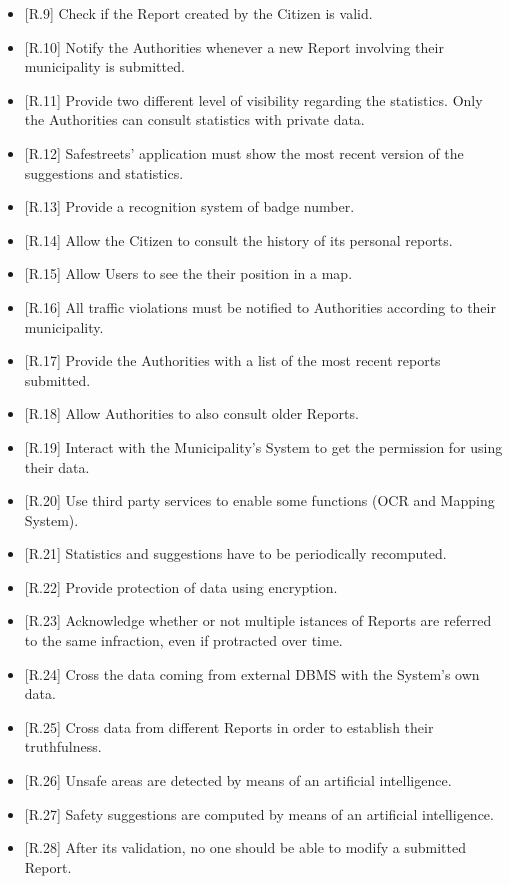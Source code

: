 \documentclass{report}
\begin{document}
\begin{itemize}
	\item {[R.9]} Check if the Report created by the Citizen is valid.
	\item {[R.10]} Notify the Authorities whenever a new Report involving their municipality is submitted. 
	\item {[R.11]} Provide two different level of visibility regarding the statistics. Only the Authorities can consult statistics with private data.
	\item {[R.12]} Safestreets' application must show the most recent version of the suggestions and statistics.
	\item {[R.13]} Provide a recognition system of badge number.
	\item {[R.14]} Allow the Citizen to consult the history of its personal reports.
	\item {[R.15]} Allow Users to see the their position in a map.
	\item {[R.16]} All traffic violations must be notified to Authorities according to their municipality.
	\item {[R.17]} Provide the Authorities with a list of the most recent reports submitted.
	\item {[R.18]} Allow Authorities to also consult older Reports.
	\item {[R.19]} Interact with the Municipality's System to get the permission for using their data.
	\item {[R.20]} Use third party services to enable some functions (OCR and Mapping System).
	\item {[R.21]} Statistics and suggestions have to be periodically recomputed.
	\item {[R.22]} Provide protection of data using encryption.
	\item {[R.23]} Acknowledge whether or not multiple istances of Reports are referred to the same infraction, even if protracted over time.
	\item {[R.24]} Cross the data coming from external DBMS with the System's own data.
	\item {[R.25]} Cross data from different Reports in order to establish their truthfulness.
	\item {[R.26]} Unsafe areas are detected by means of an artificial intelligence.
	\item {[R.27]} Safety suggestions are computed by means of an artificial intelligence.
	\item {[R.28]} After its validation, no one should be able to modify a submitted Report.
\end{itemize}
\end{document}
